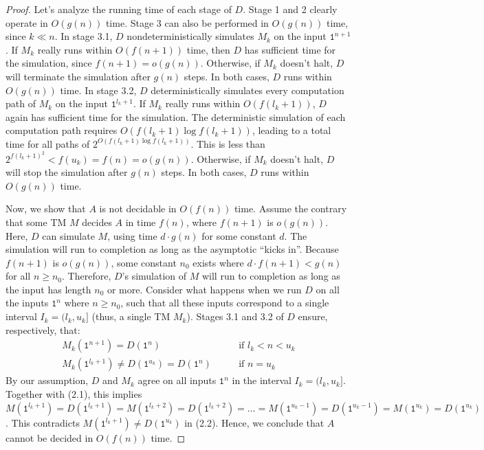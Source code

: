 \documentclass[11pt,twoside=off,numbers=noenddot]{scrbook}
\begin{document}
\begin{proof}
  Let's analyze the running time of each stage of $D$. Stage 1 and 2 clearly operate in $O(g(n))$ time. Stage 3 can also be performed in $O(g(n))$ time, since $k \ll n$. In stage 3.1, $D$ nondeterministically simulates $M_k$ on the input $\texttt{1}^{n + 1}$. If $M_k$ really runs within $O(f(n + 1))$ time, then $D$ has sufficient time for the simulation, since $f(n + 1) = o(g(n))$. Otherwise, if $M_k$ doesn't halt, $D$ will terminate the simulation after $g(n)$ steps. In both cases, $D$ runs within $O(g(n))$ time. In stage 3.2, $D$ deterministically simulates every computation path of $M_k$ on the input $\texttt{1}^{l_k + 1}$. If $M_k$ really runs within $O(f(l_k + 1))$, $D$ again has sufficient time for the simulation. The deterministic simulation of each computation path requires $O(f(l_k + 1) \log f(l_k + 1))$, leading to a total time for all paths of $2^{O(f(l_k + 1) \log f(l_k + 1))}$. This is less than $2^{f(l_k + 1)^2} < f(u_k) = f(n) = o(g(n))$. Otherwise, if $M_k$ doesn't halt, $D$ will stop the simulation after $g(n)$ steps. In both cases, $D$ runs within $O(g(n))$ time.

  Now, we show that $A$ is not decidable in $O(f(n))$ time. Assume the contrary that some TM $M$ decides $A$ in time $f(n)$, where $f(n + 1)$ is $o(g(n))$. Here, $D$ can simulate $M$, using time $d \cdot g(n)$ for some constant $d$. The simulation will run to completion as long as the asymptotic ``kicks in''. Because $f(n + 1)$ is $o(g(n))$, some constant $n_0$ exists where $d \cdot f(n + 1) < g(n)$ for all $n \geq n_0$. Therefore, $D$'s simulation of $M$ will run to completion as long as the input has length $n_0$ or more. Consider what happens when we run $D$ on all the inputs $\texttt{1}^n$ where $n \geq n_0$, such that all these inputs correspond to a single interval $I_k = (l_k, u_k]$ (thus, a single TM $M_k$). Stages 3.1 and 3.2 of $D$ ensure, respectively, that:
  \begin{align}
    \text{$M_k(\texttt{1}^{n + 1}) = D(\texttt{1}^n)$} & \qquad \text{if $l_k < n < u_k$} \\
    \text{$M_k(\texttt{1}^{l_k + 1}) \neq D(\texttt{1}^{u_k}) = D(\texttt{1}^n)$} & \qquad \text{if $n = u_k$}
  \end{align}
  By our assumption, $D$ and $M_k$ agree on all inputs $\texttt{1}^n$ in the interval $I_k = (l_k, u_k]$. Together with (2.1), this implies $M(\texttt{1}^{l_k + 1}) = D(\texttt{1}^{l_k + 1}) = M(\texttt{1}^{l_k + 2}) = D(\texttt{1}^{l_k + 2}) = \dots = M(\texttt{1}^{u_k - 1}) = D(\texttt{1}^{u_k - 1}) = M(\texttt{1}^{u_k}) = D(\texttt{1}^{u_k})$. This contradicts $M(\texttt{1}^{l_k + 1}) \neq D(\texttt{1}^{u_k})$ in (2.2). Hence, we conclude that $A$ cannot be decided in $O(f(n))$ time.
\end{proof}
\end{document}

